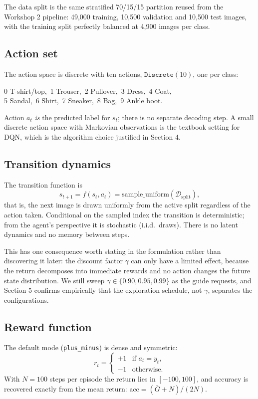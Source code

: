 \documentclass[11pt,a4paper]{article}
\begin{document}
The data split is the same stratified 70/15/15 partition reused from the Workshop 2 pipeline: 49{,}000 training, 10{,}500 validation and 10{,}500 test images, with the training split perfectly balanced at 4{,}900 images per class.

\subsection{Action set}

The action space is discrete with ten actions, $\texttt{Discrete}(10)$, one per class:
\begin{center}
0 T-shirt/top,\ 1 Trouser,\ 2 Pullover,\ 3 Dress,\ 4 Coat,\\
5 Sandal,\ 6 Shirt,\ 7 Sneaker,\ 8 Bag,\ 9 Ankle boot.
\end{center}
Action $a_t$ \emph{is} the predicted label for $s_t$; there is no separate decoding step. A small discrete action space with Markovian observations is the textbook setting for DQN, which is the algorithm choice justified in Section 4.

\subsection{Transition dynamics}

The transition function is
\[
s_{t+1} = f(s_t, a_t) = \text{sample\_uniform}(\mathcal{D}_{\text{split}}),
\]
that is, the next image is drawn uniformly from the active split regardless of the action taken. Conditional on the sampled index the transition is deterministic; from the agent's perspective it is stochastic (i.i.d.\ draws). There is no latent dynamics and no memory between steps.

This has one consequence worth stating in the formulation rather than discovering it later: the discount factor $\gamma$ can only have a limited effect, because the return decomposes into immediate rewards and no action changes the future state distribution. We still sweep $\gamma \in \{0.90, 0.95, 0.99\}$ as the guide requests, and Section 5 confirms empirically that the exploration schedule, not $\gamma$, separates the configurations.

\subsection{Reward function}

The default mode (\texttt{plus\_minus}) is dense and symmetric:
\[
r_t = \begin{cases}
+1 & \text{if } a_t = y_t,\\
-1 & \text{otherwise.}
\end{cases}
\]
With $N = 100$ steps per episode the return lies in $[-100, 100]$, and accuracy is recovered exactly from the mean return: $\text{acc} = (\bar{G} + N)/(2N)$.
\end{document}
